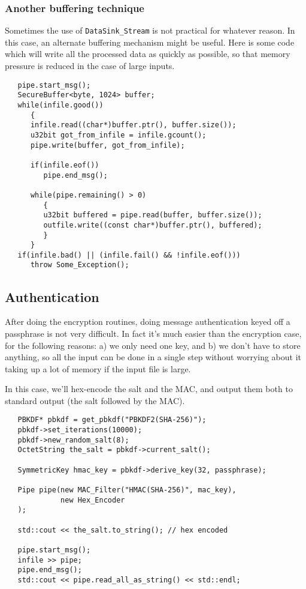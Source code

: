 \documentclass{article}
\newcommand{\type}[1]{\texttt{#1}}
\begin{document}
\subsubsection{Another buffering technique}

Sometimes the use of \type{DataSink\_Stream} is not practical for whatever
reason. In this case, an alternate buffering mechanism might be useful. Here is
some code which will write all the processed data as quickly as possible, so
that memory pressure is reduced in the case of large inputs.

\begin{verbatim}
   pipe.start_msg();
   SecureBuffer<byte, 1024> buffer;
   while(infile.good())
      {
      infile.read((char*)buffer.ptr(), buffer.size());
      u32bit got_from_infile = infile.gcount();
      pipe.write(buffer, got_from_infile);

      if(infile.eof())
         pipe.end_msg();

      while(pipe.remaining() > 0)
         {
         u32bit buffered = pipe.read(buffer, buffer.size());
         outfile.write((const char*)buffer.ptr(), buffered);
         }
      }
   if(infile.bad() || (infile.fail() && !infile.eof()))
      throw Some_Exception();
\end{verbatim}

\pagebreak

\subsection{Authentication}

After doing the encryption routines, doing message authentication keyed off a
passphrase is not very difficult. In fact it's much easier than the encryption
case, for the following reasons: a) we only need one key, and b) we don't have
to store anything, so all the input can be done in a single step without
worrying about it taking up a lot of memory if the input file is large.

In this case, we'll hex-encode the salt and the MAC, and output them both to
standard output (the salt followed by the MAC).

\begin{verbatim}
   PBKDF* pbkdf = get_pbkdf("PBKDF2(SHA-256)");
   pbkdf->set_iterations(10000);
   pbkdf->new_random_salt(8);
   OctetString the_salt = pbkdf->current_salt();

   SymmetricKey hmac_key = pbkdf->derive_key(32, passphrase);

   Pipe pipe(new MAC_Filter("HMAC(SHA-256)", mac_key),
             new Hex_Encoder
   );

   std::cout << the_salt.to_string(); // hex encoded

   pipe.start_msg();
   infile >> pipe;
   pipe.end_msg();
   std::cout << pipe.read_all_as_string() << std::endl;
\end{verbatim}
\end{document}
